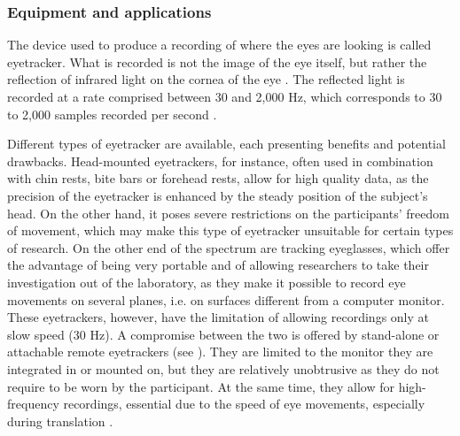 \subsubsection{Equipment and applications} \label{eyetracker}
The device used to produce a recording of where the eyes are looking is called eyetracker. What is recorded is not the image of the eye itself, but rather the reflection of infrared light on the cornea of the eye \citep[54]{duchowski_eye_2017}. The reflected light is recorded at a rate comprised between 30 and 2,000 Hz, which corresponds to 30 to 2,000 samples recorded per second \citep[399]{jakobsen_translation_2020}.

Different types of eyetracker are available, each presenting benefits and potential drawbacks. Head-mounted eyetrackers, for instance, often used in combination with chin rests, bite bars or forehead rests, allow for high quality data, as the precision of the eyetracker is enhanced by the steady position of the subject's head. On the other hand, it poses severe restrictions on the participants' freedom of movement, which may make this type of eyetracker unsuitable for certain types of research. On the other end of the spectrum are tracking eyeglasses, which offer the advantage of being very portable and of allowing researchers to take their investigation out of the laboratory, as they make it possible to record eye movements on several planes, i.e. on surfaces different from a computer monitor. These eyetrackers, however, have the limitation of allowing recordings only at slow speed (30 Hz). A compromise between the two is offered by stand-alone or attachable remote eyetrackers (see \citealt{ehrensberger-dow_challenges_2014}). They are limited to the monitor they are integrated in or mounted on, but they are relatively unobtrusive as they do not require to be worn by the participant. At the same time, they allow for high-frequency recordings, essential due to the speed of eye movements, especially during translation \citep[36]{jakobsen_TPR_2017}.

